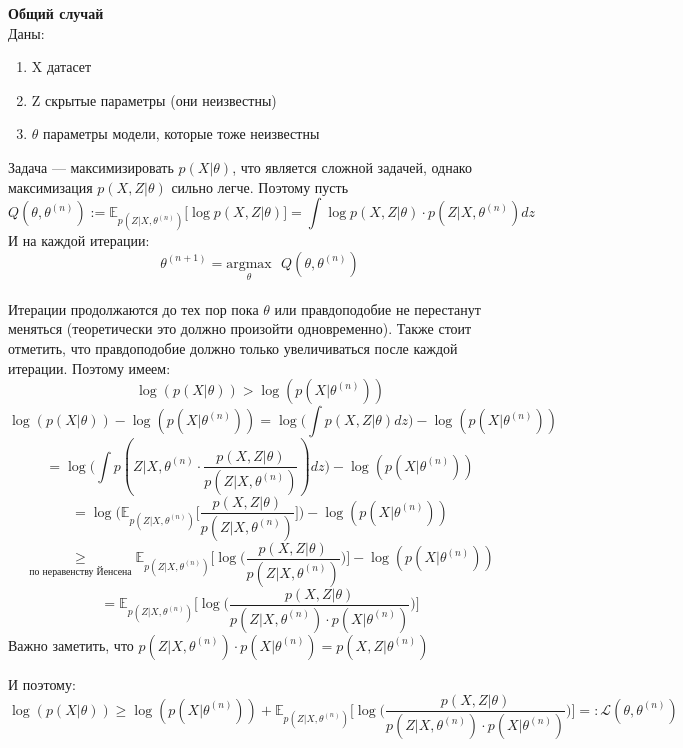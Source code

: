 \noindent\textbf{Общий случай}
\\
Даны:
\begin{enumerate}
    \item X \- датасет
    \item Z \- скрытые параметры (они неизвестны)
    \item $\theta$ \- параметры модели, которые тоже неизвестны
\end{enumerate}
Задача --- максимизировать $p(X|\theta)$, что является сложной задачей, однако максимизация $p(X, Z|\theta)$ сильно легче. Поэтому пусть
\[Q(\theta, \theta^{(n)}) := \mathbb{E}_{p(Z|X,\theta^{(n)})} \big[\log p(X,Z|\theta)\big]
= \int \log p(X,Z|\theta) \cdot p(Z|X,\theta^{(n)}) dz \]
И на каждой итерации:
\[\theta^{(n+1)} = \underset{\theta}{\mathrm{argmax }}\text{ } Q(\theta, \theta^{(n)})\]
\\
Итерации продолжаются до тех пор пока $\theta$ или правдоподобие не перестанут меняться (теоретически это должно произойти одновременно). 
Также стоит отметить, что правдоподобие должно только увеличиваться после каждой итерации. Поэтому имеем:
\[\log(p(X|\theta)) > \log(p(X|\theta^{(n)}))\]
\[\log(p(X|\theta)) - \log(p(X|\theta^{(n)})) 
= \log \Big( \int p(X,Z|\theta) dz \Big) - \log(p(X|\theta^{(n)})) \]
\[= \log \Big(\int p(Z|X,\theta^{(n)} \cdot \displaystyle \frac{p(X,Z|\theta)}{p(Z|X,\theta^{(n)})}) dz \Big) - \log(p(X|\theta^{(n)}))\]
\[= \log\Big( \mathbb{E}_{p(Z|X,\theta^{(n)})}\big[\displaystyle\frac{p(X,Z|\theta)}{p(Z|X,\theta^{(n)})} \big] \Big) - \log(p(X|\theta^{(n)})) \]
\[ \underset{\text{по неравенству Йенсена}}{\geq} \mathbb{E}_{p(Z|X,\theta^{(n)})}\Big[\log\big(\displaystyle\frac{p(X,Z|\theta)}{p(Z|X,\theta^{(n)})} \big) \Big]  - \log(p(X|\theta^{(n)})) \]
\[ = \mathbb{E}_{p(Z|X,\theta^{(n)})}\Big[\log\big(\displaystyle\frac{p(X,Z|\theta)}{p(Z|X,\theta^{(n)}) \cdot p(X|\theta^{(n)})} \big) \Big]\]
Важно заметить, что $p(Z|X,\theta^{(n)}) \cdot p(X|\theta^{(n)}) = p(X,Z|\theta^{(n)})$

\noindent И поэтому:
\[ \log(p(X|\theta)) \geq \log(p(X|\theta^{(n)})) + \mathbb{E}_{p(Z|X,\theta^{(n)})}\Big[\log\big(\displaystyle\frac{p(X,Z|\theta)}{p(Z|X,\theta^{(n)}) \cdot p(X|\theta^{(n)})} \big) \Big] =: \mathcal{L}(\theta, \theta^{(n)})\]

